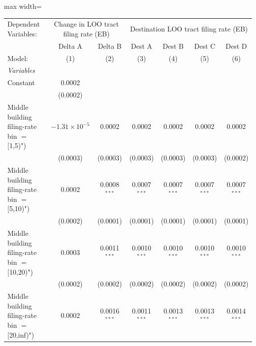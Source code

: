 \documentclass[
  11pt,
]{article}
\begin{document}
\begin{adjustbox}{max width=\textwidth}
\begingroup
\centering
\begin{tabular}{lcccccc}
   \tabularnewline \midrule \midrule
   Dependent Variables: & \multicolumn{2}{c}{Change in LOO tract filing rate (EB)} & \multicolumn{4}{c}{Destination LOO tract filing rate (EB)}\\
                                                  & Delta A                & Delta B        & Dest A         & Dest B         & Dest C                & Dest D \\   
   Model:                                         & (1)                    & (2)            & (3)            & (4)            & (5)                   & (6)\\  
   \midrule
   \emph{Variables}\\
   Constant                                       & 0.0002                 &                &                &                &                       &   \\   
                                                  & (0.0002)               &                &                &                &                       &   \\   
   Middle building filing-rate bin $=$ [1,5)")    & $-1.31\times 10^{-5}$  & 0.0002         & 0.0002         & 0.0002         & 0.0002                & 0.0002\\   
                                                  & (0.0003)               & (0.0003)       & (0.0003)       & (0.0003)       & (0.0003)              & (0.0002)\\   
   Middle building filing-rate bin $=$ [5,10)")   & 0.0002                 & 0.0008$^{***}$ & 0.0007$^{***}$ & 0.0007$^{***}$ & 0.0007$^{***}$        & 0.0007$^{***}$\\   
                                                  & (0.0002)               & (0.0001)       & (0.0001)       & (0.0001)       & (0.0001)              & (0.0001)\\   
   Middle building filing-rate bin $=$ [10,20)")  & 0.0003                 & 0.0011$^{***}$ & 0.0010$^{***}$ & 0.0010$^{***}$ & 0.0010$^{***}$        & 0.0010$^{***}$\\   
                                                  & (0.0002)               & (0.0002)       & (0.0002)       & (0.0002)       & (0.0002)              & (0.0002)\\   
   Middle building filing-rate bin $=$ [20,inf)") & 0.0002                 & 0.0016$^{***}$ & 0.0011$^{***}$ & 0.0013$^{***}$ & 0.0013$^{***}$        & 0.0014$^{***}$\\   

\end{tabular}
\end{adjustbox}
\end{document}
